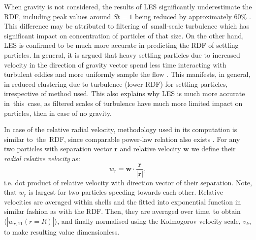 \documentclass{pracamgren}
\begin{document}
When gravity is not considered, the results of LES significantly underestimate the RDF, including peak values around $St=1$ being reduced by approximately $60 \%$ \parencite{Fede2006,Yang2008,Marchioli2008}.
This difference may be attributed to filtering of~small-scale turbulence which has significant impact on concentration of particles of that size.
On the other hand, LES is confirmed \parencite[see]{Rosa2017} to be much more accurate in predicting the RDF of settling particles.
In general, it is argued that heavy settling particles due to increased velocity in the direction of gravity vector spend less time interacting with turbulent eddies and more uniformly sample the flow \parencite{Ireland2016}.
This manifests, in general, in reduced clustering due to turbulence (lower RDF) for settling particles, irrespective of method used.
This also explains why LES is much more accurate in~this~case, as filtered scales of turbulence have much more limited impact on particles, then in case of no gravity.

\smallskip

In case of the relative radial velocity, methodology used in its computation is similar to~the~RDF, since comparable power-law relation also exists \parencite[Equation 13]{Rosa2013}.
For any two particles with separation vector $\mathbf{r}$ and relative velocity $\mathbf{w}$ we define their \emph{radial relative velocity} as:
\begin{equation}
w_r = \mathbf{w} \cdot \frac{\mathbf{r}}{|\mathbf{r}|} ,
\label{eqn:rrv}
\end{equation} 
i.e. dot product of relative velocity with direction vector of their separation.
Note, that $w_r$ is largest for two particles speeding towards each other.
Relative velocities are averaged within shells and the fitted into exponential function in similar fashion as with the RDF.
Then, they are averaged over time, to obtain $\langle|w_{r, 11}(r = R)|\rangle$, and finally normalised using the Kolmogorov velocity scale, $v_k$, to make resulting value dimensionless.
\end{document}
